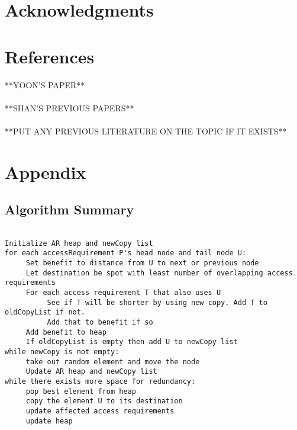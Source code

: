 \documentclass[11pt,psfig]{article}
\begin{document}
\section*{Acknowledgments}

\section*{References}

**YOON'S PAPER**\\
\\
**SHAN'S PREVIOUS PAPERS**\\
\\
**PUT ANY PREVIOUS LITERATURE ON THE TOPIC IF IT EXISTS**   

\section*{Appendix}

\subsection*{Algorithm Summary}

\begin{verbatim}

Initialize AR heap and newCopy list
for each accessRequirement P's head node and tail node U:
     Set benefit to distance from U to next or previous node
     Let destination be spot with least number of overlapping access requirements
     For each access requirement T that also uses U
          See if T will be shorter by using new copy. Add T to oldCopyList if not.
          Add that to benefit if so
     Add benefit to heap
     If oldCopyList is empty then add U to newCopy list
while newCopy is not empty:
     take out random element and move the node
     Update AR heap and newCopy list
while there exists more space for redundancy:
     pop best element from heap
     copy the element U to its destination
     update affected access requirements
     update heap

\end{verbatim}
 

\end{document}
